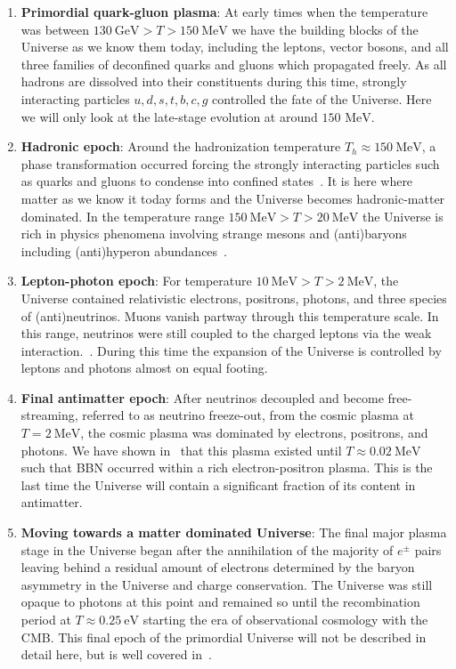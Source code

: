 \documentclass[universe,article,submit,moreauthors,pdftex,a4paper]{Definitions/mdpi}
\newcommand{\MeV}{\text{ MeV}}
\begin{document}
\begin{enumerate}
 \item \textbf{Primordial quark-gluon plasma}: At early times when the temperature was between $130\ \mathrm{GeV}>T>150\ \mathrm{MeV}$ we have the building blocks of the Universe as we know them today, including the leptons, vector bosons, and all three families of deconfined quarks and gluons which propagated freely. As all hadrons are dissolved into their constituents during this time, strongly interacting particles $u,d,s,t,b,c,g$ controlled the fate of the Universe. Here we will only look at the late-stage evolution at around $150\MeV$.
 \item \textbf{Hadronic epoch}: Around the hadronization temperature $T_h\approx150\ \mathrm{MeV}$, a phase transformation occurred forcing the strongly interacting particles such as quarks and gluons to condense into confined states~\cite{Letessier:2005qe}. It is here where matter as we know it today forms and the Universe becomes hadronic-matter dominated. In the temperature range $ 150\ \mathrm{MeV}>T>20\ \mathrm{MeV}$ the Universe is rich in physics phenomena involving strange mesons and (anti)baryons including (anti)hyperon abundances~\cite{Fromerth:2012fe,Yang:2021bko}.
 \item \textbf{Lepton-photon epoch}: For temperature $10\ \mathrm{MeV}>T>2\ \mathrm{MeV}$, the Universe contained relativistic electrons, positrons, photons, and three species of (anti)neutrinos. Muons vanish partway through this temperature scale. In this range, neutrinos were still coupled to the charged leptons via the weak interaction.~\cite{Birrell:2012gg,Birrell:2014ona}. During this time the expansion of the Universe is controlled by leptons and photons almost on equal footing.
 \item \textbf{Final antimatter epoch}: After neutrinos decoupled and become free-streaming, referred to as neutrino freeze-out, from the cosmic plasma at $T=2\ \mathrm{MeV}$, the cosmic plasma was dominated by electrons, positrons, and photons. We have shown in~\cite{Chris:2023abc} that this plasma existed until $T\approx0.02\ \mathrm{MeV}$ such that BBN occurred within a rich electron-positron plasma. This is the last time the Universe will contain a significant fraction of its content in antimatter.
 \item \textbf{Moving towards a matter dominated Universe}: The final major plasma stage in the Universe began after the annihilation of the majority of $e^{\pm}$ pairs leaving behind a residual amount of electrons determined by the baryon asymmetry in the Universe and charge conservation. The Universe was still opaque to photons at this point and remained so until the recombination period at $T\approx0.25\ \mathrm{eV}$ starting the era of observational cosmology with the CMB. This final epoch of the primordial Universe will not be described in detail here, but is well covered in~\cite{Planck:2018vyg}.
\end{enumerate}
\end{document}
